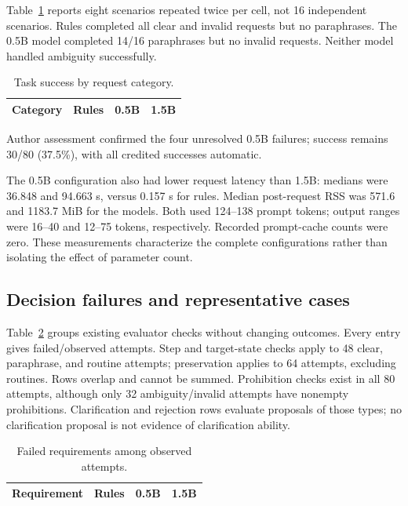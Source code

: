 \documentclass[letterpaper,conference]{IEEEtran}
\providecommand{\StudyPrefix}{}
\begin{document}
Table~\ref{tab:categories} reports eight scenarios repeated twice per cell, not 16 independent scenarios. Rules completed all clear and invalid requests but no paraphrases. The 0.5B model completed 14/16 paraphrases but no invalid requests. Neither model handled ambiguity successfully.
\begin{table}[t]\caption{Task success by request category.}
\centering\footnotesize\begin{tabular}{lrrr}\toprule
Category & Rules & 0.5B & 1.5B\\\midrule

\end{tabular}\label{tab:categories}\end{table}

Author assessment confirmed the four unresolved 0.5B failures; success remains 30/80 (37.5\%), with all credited successes automatic.

The 0.5B configuration also had lower request latency than 1.5B: medians were 36.848 and 94.663 s, versus 0.157 s for rules. Median post-request RSS was 571.6 and 1183.7 MiB for the models. Both used 124--138 prompt tokens; output ranges were 16--40 and 12--75 tokens, respectively. Recorded prompt-cache counts were zero. These measurements characterize the complete configurations rather than isolating the effect of parameter count.

\subsection{Decision failures and representative cases}
Table~\ref{tab:failures} groups existing evaluator checks without changing outcomes. Every entry gives failed/observed attempts. Step and target-state checks apply to 48 clear, paraphrase, and routine attempts; preservation applies to 64 attempts, excluding routines. Rows overlap and cannot be summed. Prohibition checks exist in all 80 attempts, although only 32 ambiguity/invalid attempts have nonempty prohibitions. Clarification and rejection rows evaluate proposals of those types; no clarification proposal is not evidence of clarification ability.
\begin{table}[t]\caption{Failed requirements among observed attempts.}
\centering\footnotesize\begin{tabular}{lrrr}\toprule
Requirement & Rules & 0.5B & 1.5B\\\midrule

\end{tabular}\label{tab:failures}\end{table}
\end{document}
